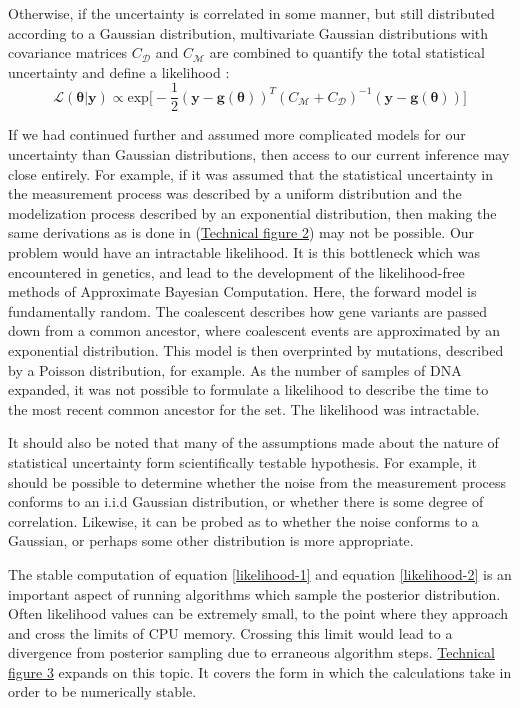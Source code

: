 Otherwise, if the uncertainty is correlated in some manner, but still distributed according to a Gaussian distribution, multivariate Gaussian distributions with covariance matrices $C_{\mathcal{D}}$ and $C_{\mathcal{M}}$ are combined to quantify the total statistical uncertainty and define a likelihood \citet[p.35-36]{Tarantola2005}:
\begin{equation}
\mathcal{L}(\bm{\theta}|\bm{y}) \propto \text{exp}\bigg[-\frac{1}{2}(\bm{y}-\bm{g}(\bm{\theta}))^T(C_{\mathcal{M}}+C_{\mathcal{D}})^{-1}(\bm{y}-\bm{g}(\bm{\theta}))\bigg]
\label{likelihood-2}
\end{equation}
\newpage

If we had continued further and assumed more complicated models for our uncertainty than Gaussian distributions, then access to our current inference may close entirely. For example, if it was assumed that the statistical uncertainty in the measurement process was described by a uniform distribution and the modelization process described by an exponential distribution, then making the same derivations as is done in (\hyperref[tf1]{Technical figure 2}) may not be possible. Our problem would have an intractable likelihood. It is this bottleneck which was encountered in genetics, and lead to the development of the likelihood-free methods of Approximate Bayesian Computation. Here, the forward model is fundamentally random. The coalescent \citep{Marjoram2006} describes how gene variants are passed down from a common ancestor, where coalescent events are approximated by an exponential distribution. This model is then overprinted by mutations, described by a Poisson distribution, for example. As the number of samples of DNA expanded, it was not possible to formulate a likelihood to describe the time to the most recent common ancestor for the set. The likelihood was intractable.\par

It should also be noted that many of the assumptions made about the nature of statistical uncertainty form scientifically testable hypothesis. For example, it should be possible to determine whether the noise from the measurement process conforms to an i.i.d Gaussian distribution, or whether there is some degree of correlation. Likewise, it can be probed as to whether the noise conforms to a Gaussian, or perhaps some other distribution is more appropriate.\par

The stable computation of equation \ref{likelihood-1} and equation \ref{likelihood-2} is an important aspect of running algorithms which sample the posterior distribution. Often likelihood values can be extremely small, to the point where they approach and cross the limits of CPU memory. Crossing this limit would lead to a divergence from posterior sampling due to erraneous algorithm steps. \hyperref[tf3]{Technical figure 3} expands on this topic. It covers the form in which the calculations take in order to be numerically stable.\par

